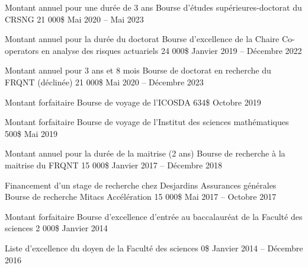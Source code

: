 
\begin{cventries}
  \cventry
    {Montant annuel pour une durée de 3 ans} %
    {Bourse d'études supérieures-doctorat du CRSNG} %
    {21 000\$} %
    {Mai 2020 -- Mai 2023} %
    {}
    
  \cventry
    {Montant annuel pour la durée du doctorat} %
    {Bourse d'excellence de la Chaire Co-operators en analyse des risques actuariels} %
    {24 000\$} %
    {Janvier 2019 -- Décembre 2022} %
    {}
    
  \cventry
    {Montant annuel pour 3 ans et 8 mois} %
    {Bourse de doctorat en recherche du FRQNT (déclinée)} %
    {21 000\$} %
    {Mai 2020 -- Décembre 2023} %
    {}

  \cventry
    {Montant forfaitaire} %
    {Bourse de voyage de l'ICOSDA} %
    {634\$} %
    {Octobre 2019} %
    {}
    
  \cventry
    {Montant forfaitaire} %
    {Bourse de voyage de l'Institut des sciences mathématiques} %
    {500\$} %
    {Mai 2019} %
    {}
    
  \cventry
    {Montant annuel pour la durée de la maitrise (2 ans)} %
    {Bourse de recherche à la maitrise du FRQNT} %
    {15 000\$} %
    {Janvier 2017 -- Décembre 2018} %
    {}

  \cventry
    {Financement d'un stage de recherche chez Desjardins Assurances générales} %
    {Bourse de recherche Mitacs Accélération} %
    {15 000\$} %
    {Mai 2017 -- Octobre 2017} %
    {}
    
  \cventry
    {Montant forfaitaire} %
    {Bourse d'excellence d'entrée au baccalauréat de la Faculté des sciences} %
    {2 000\$} %
    {Janvier 2014} %
    {}
    
  \cventry
    {} %
    {Liste d'excellence du doyen de la Faculté des sciences} %
    {0\$} %
    {Janvier 2014 -- Décembre 2016} %
    {}

  
\end{cventries}
